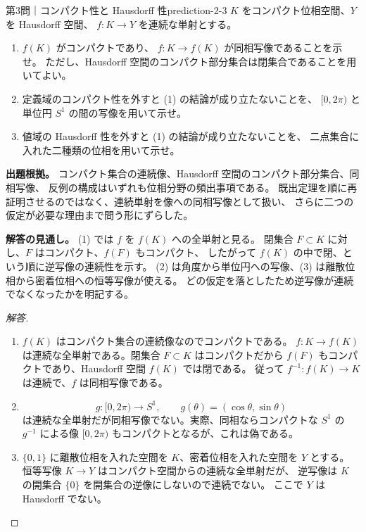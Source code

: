 \begin{problem}{第3問｜コンパクト性と Hausdorff 性}{prediction-2-3}
$K$ をコンパクト位相空間、$Y$ を Hausdorff 空間、
$f:K\to Y$ を連続な単射とする。
\begin{enumerate}
  \item[(1)] $f(K)$ がコンパクトであり、
  $f:K\to f(K)$ が同相写像であることを示せ。
  ただし、Hausdorff 空間のコンパクト部分集合は閉集合であることを用いてよい。
  \item[(2)] 定義域のコンパクト性を外すと (1) の結論が成り立たないことを、
  $[0,2\pi)$ と単位円 $S^1$ の間の写像を用いて示せ。
  \item[(3)] 値域の Hausdorff 性を外すと (1) の結論が成り立たないことを、
  二点集合に入れた二種類の位相を用いて示せ。
\end{enumerate}
\end{problem}
\begin{memo*}
\textbf{出題根拠。}
コンパクト集合の連続像、Hausdorff 空間のコンパクト部分集合、同相写像、
反例の構成はいずれも位相分野の頻出事項である。
既出定理を順に再証明させるのではなく、連続単射を像への同相写像として扱い、
さらに二つの仮定が必要な理由まで問う形にずらした。

\textbf{解答の見通し。}
(1) では $f$ を $f(K)$ への全単射と見る。
閉集合 $F\subset K$ に対し、$F$ はコンパクト、$f(F)$ もコンパクト、
したがって $f(K)$ の中で閉、という順に逆写像の連続性を示す。
(2) は角度から単位円への写像、(3) は離散位相から密着位相への恒等写像が使える。
どの仮定を落としたため逆写像が連続でなくなったかを明記する。
\end{memo*}
\begin{proof}[解答]
\begin{enumerate}
  \item[(1)] $f(K)$ はコンパクト集合の連続像なのでコンパクトである。
  $f:K\to f(K)$ は連続な全単射である。閉集合 $F\subset K$ はコンパクトだから
  $f(F)$ もコンパクトであり、Hausdorff 空間 $f(K)$ では閉である。
  従って $f^{-1}:f(K)\to K$ は連続で、$f$ は同相写像である。

  \item[(2)]
  \[
  g:[0,2\pi)\to S^1,\qquad g(\theta)=(\cos\theta,\sin\theta)
  \]
  は連続な全単射だが同相写像でない。実際、同相ならコンパクトな $S^1$ の
  $g^{-1}$ による像 $[0,2\pi)$ もコンパクトとなるが、これは偽である。

  \item[(3)] $\{0,1\}$ に離散位相を入れた空間を $K$、密着位相を入れた空間を $Y$ とする。
  恒等写像 $K\to Y$ はコンパクト空間からの連続な全単射だが、
  逆写像は $K$ の開集合 $\{0\}$ を開集合の逆像にしないので連続でない。
  ここで $Y$ は Hausdorff でない。
\end{enumerate}
\end{proof}

